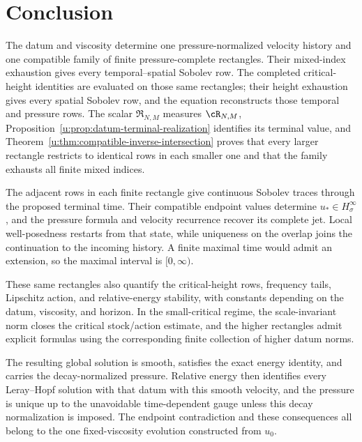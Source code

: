 \section{Conclusion}

The datum and viscosity determine one pressure-normalized velocity history and
one compatible family of finite pressure-complete rectangles.  Their
mixed-index exhaustion gives every temporal--spatial Sobolev row.  The
completed critical-height identities are evaluated on those same rectangles;
their height exhaustion gives every spatial Sobolev row, and the equation
reconstructs those temporal and pressure rows.  The scalar
\(\mathfrak R_{N,M}\) measures \(\cR_{N,M}\),
Proposition~\ref{u:prop:datum-terminal-realization} identifies its terminal
value, and Theorem~\ref{u:thm:compatible-inverse-intersection} proves
that every larger rectangle restricts to identical rows in each smaller one and
that the family exhausts all finite mixed indices.

The adjacent rows in each finite rectangle give continuous Sobolev traces
through the proposed terminal time.  Their compatible endpoint values determine
\(u_*\in H^\infty_\sigma\), and the pressure formula and velocity
recurrence recover its complete jet.  Local well-posedness restarts from
that state, while uniqueness on the overlap joins the continuation to the
incoming history.  A finite maximal time would admit an extension, so the
maximal interval is \([0,\infty)\).

These same rectangles also quantify the critical-height rows, frequency tails,
Lipschitz action, and relative-energy stability, with constants depending on
the datum, viscosity, and horizon.  In the small-critical regime, the
scale-invariant norm closes the critical stock/action estimate, and the higher
rectangles admit explicit formulas using the corresponding finite collection
of higher datum norms.

The resulting global solution is smooth, satisfies the exact energy identity,
and carries the decay-normalized pressure.  Relative energy then identifies
every Leray--Hopf solution with that datum with this smooth velocity, and
the pressure is unique up to the unavoidable time-dependent gauge unless this decay normalization is imposed.  The endpoint contradiction and these
consequences all belong to the one fixed-viscosity evolution constructed from
\(u_0\).
